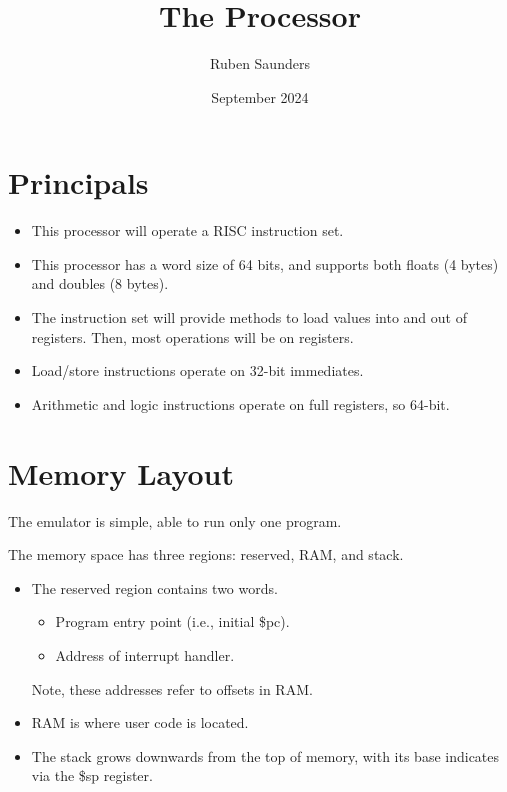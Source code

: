 \documentclass[10pt]{article}
\title{The Processor}
\author{Ruben Saunders}
\date{September 2024}
\begin{document}
    \maketitle
    \tableofcontents

    \newpage

    \section{Principals}\label{sec:principals}

    \begin{itemize}
        \item This processor will operate a RISC instruction set.
        \item This processor has a word size of 64 bits, and supports both floats (4 bytes) and doubles (8 bytes).
        \item The instruction set will provide methods to load values into and out of registers.
        Then, most operations will be on registers.
        \item Load/store instructions operate on 32-bit immediates.
        \item Arithmetic and logic instructions operate on full registers, so 64-bit.
    \end{itemize}

    \section{Memory Layout}\label{sec:memory-layout}

    The emulator is simple, able to run only one program.

    The memory space has three regions: reserved, RAM, and stack.
    \begin{itemize}
        \item The reserved region contains two words.
        \begin{itemize}
            \item Program entry point (i.e., initial \$pc).
            \item Address of interrupt handler.
        \end{itemize}
        Note, these addresses refer to offsets in RAM.
        \item RAM is where user code is located.
        \item The stack grows downwards from the top of memory, with its base indicates via the \$sp register.
    \end{itemize}
\end{document}
